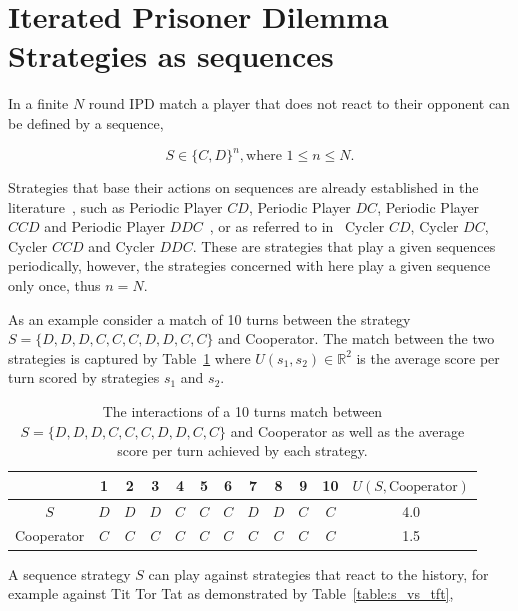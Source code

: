 \section{Iterated Prisoner Dilemma Strategies as sequences}\label{section:ipd_as_sequences}

In a finite \(N\) round IPD match a player that does not react to their opponent
can be defined by a sequence,

\begin{equation}
    S \in \{C, D\} ^ n, \text{where } 1 \leq n \leq N.
\end{equation}

Strategies that base their actions on sequences are already established in the
literature~\cite{Beaufils1997}, such as Periodic Player \(CD\), Periodic Player \(DC\),
Periodic Player \(CCD\) and Periodic Player \(DDC\)~\cite{Li2011, Mittal2009},
or as referred to in~\cite{Knight2016} Cycler \(CD\), Cycler \(DC\),
Cycler \(CCD\) and Cycler \(DDC\). These are strategies that play a given sequences
periodically, however, the strategies concerned with here play a given
sequence only once, thus \(n = N\).

As an example consider a match of 10 turns between the strategy \(S = \{D, D, D,
C, C, C, D, D, C, C\}\) and Cooperator. The match between the two strategies
is captured by Table~\ref{table:s_vs_cooperator} where \(U(s_1, s_2)\in
\mathbb{R}^2\) is the average score per turn scored by strategies \(s_1\) and
\(s_2\).

\begin{table}[htb]
\centering
\begin{tabular}{cccccccccccc}
    & \textbf{1} & \textbf{2} & \textbf{3} & \textbf{4}  & \textbf{5} & \textbf{6} & \textbf{7} & \textbf{8}  & \textbf{9} & \textbf{10} & 
    \(U(S, \text{Cooperator})\) \\ \midrule
    \(S\) & \(D\) & \(D\) & \(D\) & \(C\) & \(C\) & \(C\) & \(D\) & \(D\) & \(C\) & \(C\) & 4.0 \\
    Cooperator & \(C\) & \(C\) & \(C\) & \(C\) & \(C\) & \(C\) & \(C\) & \(C\) & \(C\) & \(C\) & 1.5 \\ \bottomrule
\end{tabular}
\caption{The interactions of a 10 turns match between \(S = \{D, D, D, C, C, C, D, D, C, C\}\) and
Cooperator as well as the average score per turn achieved by each strategy.}\label{table:s_vs_cooperator}
\end{table}

A sequence strategy \(S\) can play against strategies that react to the history,
for example against Tit Tor Tat as demonstrated by Table~\ref{table:s_vs_tft},

